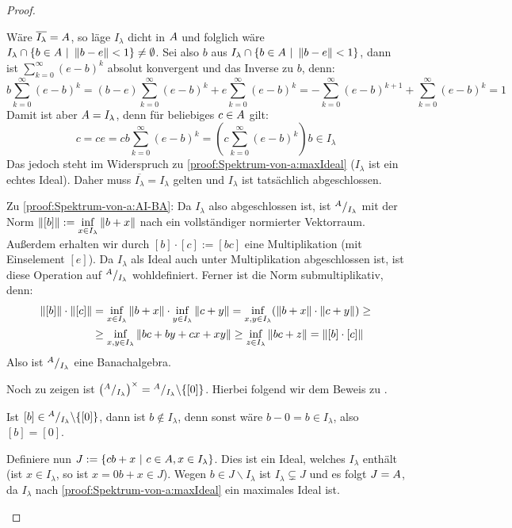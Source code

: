 \begin{proof}
\begin{itemize}
Wäre $\overline{I_\lambda} = A$, so läge $I_\lambda$ dicht in $A$ und folglich wäre $I_\lambda \cap \{b \in A ~|~ \left\lVert b-e\right\rVert < 1\} \neq \emptyset$. Sei also $b$ aus $I_\lambda \cap \{b \in A ~|~ \left\lVert b-e\right\rVert < 1\}$, dann ist $\sum_{k=0}^\infty(e-b)^k$ absolut konvergent und das Inverse zu $b$, denn:
	\[b\sum_{k=0}^\infty(e-b)^k = (b-e)\sum_{k=0}^\infty(e-b)^k + e\sum_{k=0}^\infty(e-b)^k = -\sum_{k=0}^\infty(e-b)^{k+1} +\sum_{k=0}^\infty(e-b)^k = 1\]
Damit ist aber $A = I_\lambda$, denn für beliebiges $c \in A$ gilt:
	\[c = ce = cb\sum_{k=0}^\infty(e-b)^k = \left(c\sum_{k=0}^\infty(e-b)^k\right) b \in I_\lambda\]
Das jedoch steht im Widerspruch zu \ref{proof:Spektrum-von-a:maxIdeal} ($I_\lambda$ ist ein echtes Ideal). Daher muss $\overline{I_\lambda} = I_\lambda$ gelten und $I_\lambda$ ist tatsächlich abgeschlossen.


Zu \ref{proof:Spektrum-von-a:AI-BA}:
Da $I_\lambda$ also abgeschlossen ist, ist $^A/_{I_\lambda}$ mit der Norm $\left\lVert[b]\right\rVert := \underset{x \in I_\lambda}{\inf}\left\lVert b+x\right\rVert$ nach  ein vollständiger normierter Vektorraum. Außerdem erhalten wir durch $[b]\cdot [c] := [bc]$ eine Multiplikation (mit Einselement $[e]$). Da $I_\lambda$ als Ideal auch unter Multiplikation abgeschlossen ist, ist diese Operation auf $^A/_{I_\lambda}$ wohldefiniert. Ferner ist die Norm submultiplikativ, denn:
	\begin{align*}
		\left\lVert[b]\right\rVert \cdot \left\lVert[c]\right\rVert &= \underset{x \in I_\lambda}{\inf}\left\lVert b+x\right\rVert \cdot \underset{y \in I_\lambda}{\inf}\left\lVert c+y\right\rVert = \underset{x,y \in I_\lambda}{\inf}(\left\lVert b+x\right\rVert \cdot \left\lVert c+y\right\rVert) \geq \\
		&\geq \underset{x,y \in I_\lambda}{\inf}\left\lVert bc+by+cx+xy\right\rVert \geq \underset{z \in I_\lambda}{\inf}\left\lVert bc+z\right\rVert = \left\lVert[b]\cdot[c]\right\rVert
	\end{align*}
Also ist $^A/_{I_\lambda}$ eine Banachalgebra.

Noch zu zeigen ist $\left({}^A/_{I_\lambda}\right)^\times = {}^A/_{I_\lambda} \backslash \{[0]\}$. Hierbei folgend wir dem Beweis zu \cite[Lemma IX.2.5(e)]{Werner2011}.

Ist $[b] \in {}^A/_{I_\lambda} \backslash \{[0]\}$, dann ist $b \notin I_\lambda$, denn sonst wäre $b-0 = b \in I_\lambda$, also $[b] = [0]$.

Definiere nun $J := \{cb + x ~|~ c\in A, x\in I_\lambda\}$. Dies ist ein Ideal, welches $I_\lambda$ enthält (ist $x \in I_\lambda$, so ist $x = 0b+x \in J$). Wegen $b \in J \backslash I_\lambda$ ist $I_\lambda \subsetneq J$ und es folgt $J = A$, da $I_\lambda$ nach \ref{proof:Spektrum-von-a:maxIdeal} ein maximales Ideal ist.


\end{itemize}
\end{proof}
